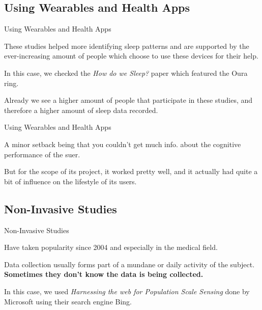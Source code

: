 \documentclass{beamer}
\begin{document}
\subsection{Using Wearables and Health Apps}

\begin{frame}{Using Wearables and Health Apps}

These studies helped more identifying sleep patterns and are supported by the ever-increasing amount of people which choose to use these devices for their help. \\

\medskip 

In this case, we checked the \textit{How do we Sleep?} paper which featured the Oura ring. \\ 

\medskip

Already we see a higher amount of people that participate in these studies, and therefore a higher amount of sleep data recorded.

\end{frame}

\begin{frame}{Using Wearables and Health Apps}

A minor setback being that you couldn't get much info. about the cognitive performance of the suer. \\

\bigskip 

But for the scope of its project, it worked pretty well, and it actually had quite a bit of influence on the lifestyle of its users.

\end{frame}

\subsection{Non-Invasive Studies}

\begin{frame}{Non-Invasive Studies}

Have taken popularity since 2004 and especially in the medical field. \\ 

\bigskip

Data collection usually forms part of a mundane or daily activity of the subject. \textbf{Sometimes they don't know the data is being collected.} \\ 

\bigskip 

In this case, we used \textit{Harnessing the web for Population Scale Sensing} done by Microsoft using their search engine Bing. \\

\end{frame}
\end{document}
